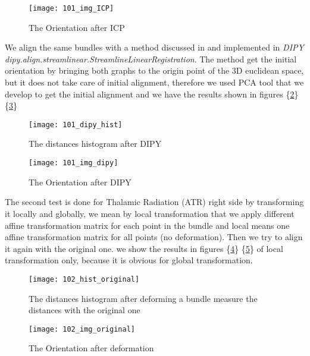 \documentclass[../structure.tex]{subfiles}
\begin{document}
\begin{figure}[h!]
\centering
\texttt{[image: 101\_img\_ICP]}
\captionsetup{justification=centering}
\caption{The Orientation after ICP}
\label{fig:img_ICP}
\end{figure}
\pagebreak
We align the same bundles with a method discussed in \cite{ODonnell2012} and implemented in \textit{DIPY dipy.align.streamlinear.StreamlineLinearRegistration}. The method get the initial orientation by bringing both graphs to the origin point of the 3D euclidean space, but it does not take care of initial alignment, therefore we used PCA tool that we develop to get the initial alignment and we have the results shown in figures \{\ref{fig:dipy_hist}\} \{\ref{fig:img_dipy}\}

\begin{figure}[h!]
\centering
\texttt{[image: 101\_dipy\_hist]}
\captionsetup{justification=centering}
\caption{The distances histogram after DIPY}
\label{fig:dipy_hist}
\end{figure}

\begin{figure}[h!]
\centering
\texttt{[image: 101\_img\_dipy]}
\captionsetup{justification=centering}
\caption{The Orientation after DIPY}
\label{fig:img_dipy}
\end{figure}
\pagebreak

The second test is done for Thalamic Radiation (ATR) right side by transforming it locally and globally, we mean by local transformation that we apply different affine transformation matrix for each point in the bundle and local means one affine transformation matrix for all points (no deformation). Then we try to align it again with the original one. we show the results in figures \{\ref{fig:hist_original_def}\} \{\ref{fig:img_original_def}\} of local transformation only, because it is obvious for global transformation.

\begin{figure}[h!]
\centering
\texttt{[image: 102\_hist\_original]}
\captionsetup{justification=centering}
\caption{The distances histogram after deforming a bundle measure the distances with the original one}
\label{fig:hist_original_def}
\end{figure}

\begin{figure}[h!]
\centering
\texttt{[image: 102\_img\_original]}
\captionsetup{justification=centering}
\caption{The Orientation after deformation}
\label{fig:img_original_def}
\end{figure}
\pagebreak
\end{document}

